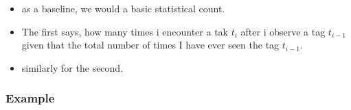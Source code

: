 \documentclass[11pt]{article}
\begin{document}
\begin{minipage}[l]{.5\linewidth}
    \begin{figure}[H]
        \centering
    \end{figure}    
\end{minipage}\hfill
\begin{minipage}[r]{.48\linewidth}
    \begin{itemize}
        \item as a baseline, we would a basic statistical count.
        \item The first says, how many times i encounter a tak $t_i$ after i observe a tag $t_{i-1}$ given that the total number of times I have ever seen the tag $t_{i-1}$.
        \item similarly for the second.
    \end{itemize}
\end{minipage}

\subsubsection{Example}
\end{document}
